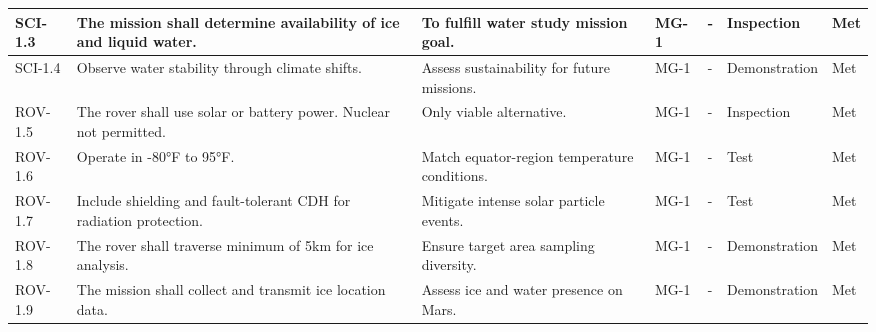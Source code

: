 \begin{table}[H]
{\begin{tabular}{|C{1.2cm}|C{4.5cm}|C{3.5cm}|C{1.2cm}|C{2.8cm}|C{2cm}|C{1cm}|}
SCI-1.3 & The mission shall determine availability of ice and liquid water. & To fulfill water study mission goal. & MG-1 & - & Inspection & Met \\
\hline
SCI-1.4 & Observe water stability through climate shifts. & Assess sustainability for future missions. & MG-1 & - & Demonstration & Met \\
\hline
ROV-1.5 & The rover shall use solar or battery power. Nuclear not permitted. & Only viable alternative. & MG-1 & - & Inspection & Met \\
\hline
ROV-1.6 & Operate in -80°F to 95°F. & Match equator-region temperature conditions. & MG-1 & - & Test & Met \\
\hline
ROV-1.7 & Include shielding and fault-tolerant CDH for radiation protection. & Mitigate intense solar particle events. & MG-1 & - & Test & Met \\
\hline
ROV-1.8 & The rover shall traverse minimum of 5km for ice analysis. & Ensure target area sampling diversity. & MG-1 & - & Demonstration & Met \\
\hline
ROV-1.9 & The mission shall collect and transmit ice location data. & Assess ice and water presence on Mars. & MG-1 & - & Demonstration & Met \\
\hline
\end{tabular}
}
\end{table}
